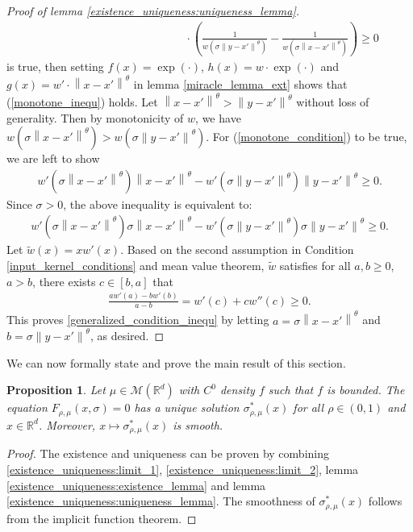 \documentclass[10pt]{article}
\newcommand{\norm}[1]{\left\lVert#1\right\rVert}
\newtheorem{proposition}{\bf Proposition}
\newenvironment{Proof of lemma}{\noindent{\bf Proof of Lemma}}{\hfill$\Box$\newline}
\newenvironment{Proof of claim}{\noindent{\bf Proof of claim}}{\hfill$\Box$\newline}
\newenvironment{Proof of theorem}{\noindent{\bf Proof of Theorem}}{\hfill\scriptsize{$\Box$}\newline}
\newenvironment{Proof of theorems}{\noindent{\bf Proof of Theorems}}{\hfill$\Box$\newline}
\newenvironment{Proof of proposition}{\noindent{\bf Proof of Proposition}}{\hfill$\Box$\newline}
\newenvironment{Proof of propositions}{\noindent{\bf Proof of Propositions}}{\hfill$\Box$\newline}
\newenvironment{Proof of exercise}{\noindent{\it Proof of Exercise:}}{\hfill$\Box$}
\numberwithin{equation}{section}
\begin{document}
\begin{proof}[Proof of lemma \ref{existence_uniqueness:uniqueness_lemma}]
\begin{align}
         & \qquad \qquad \qquad \qquad \qquad \qquad \cdot \left(\frac{1}{w(\sigma\norm{y-x'}^{\theta})}-\frac{1}{w(\sigma\norm{x-x'}^{\theta})}\right) \geq 0
    \end{align}
    is true, then setting $f(x) = \exp(\cdot)$, $h(x) = w \cdot \exp(\cdot)$ and $g(x) = w'\cdot \norm{x-x'}^{\theta}$ in lemma \ref{miracle_lemma_ext} shows that (\ref{monotone_inequ}) holds. Let $\norm{x-x'}^{\theta} > \norm{y-x'}^{\theta}$ without loss of generality. Then by monotonicity of $w$, we have $w(\sigma\norm{x-x'}^{\theta})>w(\sigma\norm{y-x'}^{\theta})$. For (\ref{monotone_condition}) to be true, we are left to show
    \begin{align}
        w'(\sigma\norm{x-x'}^{\theta})\norm{x-x'}^{\theta}-w'(\sigma\norm{y-x'}^{\theta})\norm{y-x'}^{\theta} \geq 0.
    \end{align}
    Since $\sigma >0$, the above inequality is equivalent to:
    \begin{align} \label{generalized_condition_inequ}
        w'(\sigma\norm{x-x'}^{\theta})\sigma \norm{x-x'}^{\theta}-w'(\sigma\norm{y-x'}^{\theta}) \sigma \norm{y-x'}^{\theta} \geq 0.
    \end{align}
    Let $\tilde{w}(x) = x w'(x)$. Based on the second assumption in Condition \ref{input_kernel_conditions} and mean value theorem, $\tilde{w}$ satisfies for all $a,b\geq 0$, $a>b$, there exists $c \in [b,a]$ that
    \begin{align}
        \frac{aw'(a) - bw'(b)}{a-b} = w'(c) + cw''(c) \geq 0.
    \end{align}
    This proves \eqref{generalized_condition_inequ} by letting $a = \sigma\norm{x-x'}^{\theta}$ and $b = \sigma\norm{y-x'}^{\theta}$, as desired.
\end{proof}
We can now formally state and prove the main result of this section.
\begin{proposition}
    Let $\mu \in \mathcal{M}(\mathbb{R}^d)$ with $C^0$ density $f$ such that $f$ is bounded. The equation $F_{\rho,\mu}(x,\sigma) = 0$ has a unique solution $\sigma^*_{\rho,\mu}(x)$ for all $\rho \in (0,1)$ and $x \in \mathbb{R}^d$. Moreover, $x \mapsto \sigma^*_{\rho,\mu}(x)$ is smooth.
\end{proposition}
\begin{proof}
    The existence and uniqueness can be proven by combining \eqref{existence_uniqueness:limit_1}, \eqref{existence_uniqueness:limit_2}, lemma \ref{existence_uniqueness:existence_lemma} and lemma \ref{existence_uniqueness:uniqueness_lemma}. The smoothness of $\sigma^*_{\rho,\mu}(x)$ follows from the implicit function theorem.
\end{proof}
\end{document}
